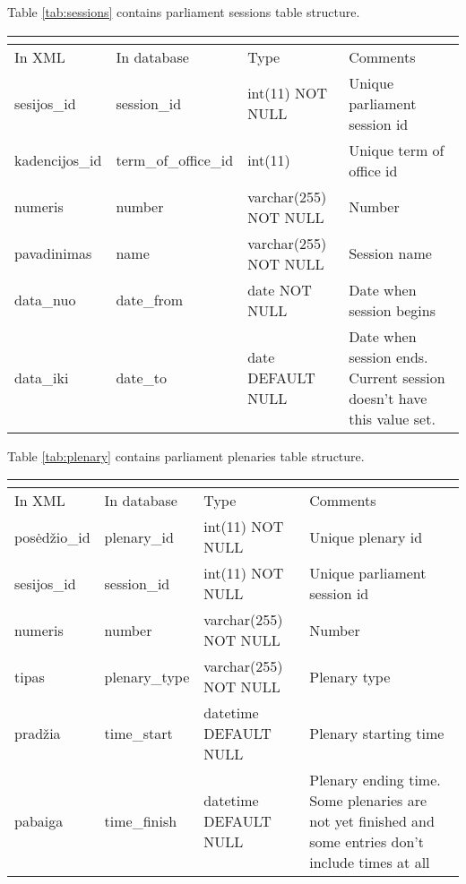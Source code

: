 \documentclass[a4paper,12pt]{article}
\begin{document}
	
	\noindent
	Table \ref{tab:sessions} contains parliament sessions table structure.
	\begin{center}
		\begin{tabular}{L{3cm} L{3cm} L{2.2cm} L{3.8cm}}
			\\ 
			\hline
			In XML & In database & Type & Comments\\
			\hline 
			sesijos\_id & session\_id & int(11) NOT NULL & Unique parliament session id \\
			kadencijos\_id & term\_of\_office\_id & int(11) & Unique term of office id \\ 
			numeris & number & varchar(255) NOT NULL & Number \\ 
			pavadinimas & name & varchar(255) NOT NULL & Session name \\ 
			data\_nuo & date\_from & date NOT NULL & Date when session begins \\
			data\_iki & date\_to & date DEFAULT NULL & Date when session ends. Current session doesn't have this value set. \\
			\hline
		\end{tabular}
		 \label{tab:sessions}
	\end{center}
	
	\hfill
	
	\noindent
	Table \ref{tab:plenary} contains parliament plenaries table structure.
	\begin{center}
		\begin{tabular}{L{3cm} L{3cm} L{2.2cm} L{3.8cm}}
			\\ 
			\hline
			In XML & In database & Type & Comments\\
			\hline
			posėdžio\_id & plenary\_id & int(11) NOT NULL & Unique plenary id \\
			sesijos\_id & session\_id & int(11) NOT NULL & Unique parliament session id \\
			numeris & number & varchar(255) NOT NULL & Number \\ 
			tipas & plenary\_type & varchar(255) NOT NULL & Plenary type \\ 
			pradžia & time\_start & datetime DEFAULT NULL & Plenary starting time \\
			pabaiga & time\_finish & datetime DEFAULT NULL & Plenary ending time. Some plenaries are not yet finished and some entries don't include times at all \\
			\hline
		\end{tabular}
		 \label{tab:plenary}
	\end{center}
	
\end{document}

